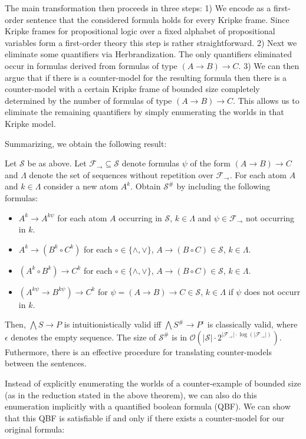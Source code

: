 \documentclass[a4paper,UKenglish,cleveref, autoref, thm-restate]{lipics-v2021}
\begin{document}
The main transformation then proceeds in three steps:
%
1) We encode as a first-order sentence that the considered formula holds for every Kripke frame.
Since Kripke frames for propositional logic over a fixed alphabet of propositional variables form a first-order theory this step is rather straightforward.
%
2) Next we eliminate some quantifiers via Herbrandization. The only quantifiers eliminated occur in formulas derived from formulas of type $(A\to B)\to C$.
%
3) We can then argue that if there is a counter-model for the resulting formula then there is a counter-model with a certain Kripke frame of bounded size completely determined by the number of formulas of type $(A\to B)\to C$.
This allows us to eliminate the remaining quantifiers by simply enumerating the worlds in that Kripke model.

Summarizing, we obtain the following result:

\begin{theorem}
\label{thm:reduction-propositional}
	Let $\mathcal S$ be as above. Let $\mathcal F_\to\subseteq\mathcal S$ denote formulas $\psi$ of the form $(A\to B)\to C$ and $\Lambda$ denote the set of sequences without repetition over $\mathcal F_\to$. For each atom $A$ and $k\in\Lambda$ consider a new atom $A^k$. Obtain $\mathcal S^\#$ by including the following formulas:
	\begin{itemize}
		\item $A^k\to A^{k\psi}$ for each atom $A$ occurring in $\mathcal S$, $k\in\Lambda$ and $\psi\in\mathcal F_\to$ not occurring in $k$.
		\item $A^k\to (B^k\circ C^k)$ for each $\circ\in\{\wedge,\vee\}$, $A\to (B\circ C)\in\mathcal S$, $k\in\Lambda$.
		\item $(A^k\circ B^k)\to C^k$ for each $\circ\in\{\wedge,\vee\}$, $A\to (B\circ C)\in\mathcal S$, $k\in\Lambda$.
		\item $(A^{k\psi}\to B^{k\psi})\to C^k$ for $\psi = (A\to B)\to C\in\mathcal S$, $k\in\Lambda$ if $\psi$ does not occurr in $k$.
	\end{itemize}
Then, $\bigwedge S\to P$ is intuitionistically valid iff $\bigwedge S^\#\to P^\epsilon$ is classically valid, where $\epsilon$ denotes the empty sequence. The size of $\mathcal S^\#$ is in $\mathcal O(|\mathcal S|\cdot2^{|\mathcal F_\to|\cdot\log(|\mathcal F_\to|)})$. Futhermore, there is an effective procedure for translating counter-models between the sentences.
\end{theorem}

Instead of explicitly enumerating the worlds of a counter-example of bounded size (as in the reduction stated in the above theorem), we can also do this enumeration implicitly with a quantified boolean formula (QBF).
We can show that this QBF is satisfiable if and only if there exists a counter-model for our original formula:
\end{document}
